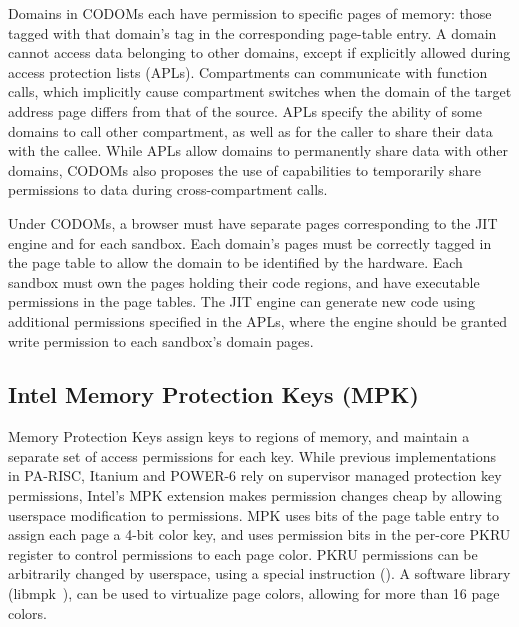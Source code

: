 Domains in CODOMs each have permission to specific pages of memory: 
those tagged with that domain's tag in the corresponding page-table entry.
A domain cannot access data belonging to other domains, except if
explicitly allowed during access protection lists (APLs).
Compartments can communicate with function calls, which implicitly
cause compartment switches when the domain of the target address page
differs from that of the source.
APLs specify the ability of some domains to call other compartment,
as well as for the caller to share their data with the callee.
While APLs allow domains to permanently share data with other domains,
CODOMs also proposes the use of capabilities to temporarily share
permissions to data during cross-compartment calls.

Under CODOMs, a browser must have separate pages corresponding to the
JIT engine and for each sandbox. 
Each domain's pages must be correctly tagged in the page table to allow
the domain to be identified by the hardware.
Each sandbox must own the pages holding their code regions, and have
executable permissions in the page tables. 
The JIT engine can generate new code using additional permissions specified
in the APLs, where the engine should be granted write permission to
each sandbox's domain pages.

\subsection{Intel Memory Protection Keys (MPK)}
Memory Protection Keys assign keys to regions of memory, and maintain
a separate set of access permissions for each key.
While previous implementations in PA-RISC, Itanium and POWER-6 rely on 
supervisor managed protection key permissions, Intel's MPK extension
makes permission changes cheap by allowing userspace modification to
permissions.
MPK uses bits of the page table entry to assign each page a 4-bit color key,
and uses permission bits in the per-core PKRU register to control permissions
to each page color.
PKRU permissions can be arbitrarily changed by userspace, using a special
instruction ().
A software library (libmpk~\cite{ParkLXMK19}), can be used to virtualize 
page colors, allowing for more than 16 page colors.

